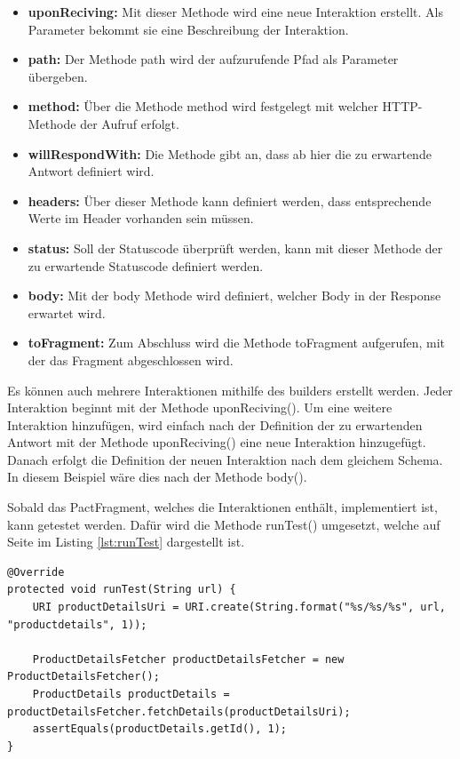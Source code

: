 \documentclass{llncs}
\begin{document}
\begin{itemize}
\item \textbf{uponReciving: } Mit dieser Methode wird eine neue Interaktion erstellt. Als Parameter bekommt sie eine Beschreibung der Interaktion.
\item \textbf{path: } Der Methode path wird der aufzurufende Pfad als Parameter übergeben.
\item \textbf{method: } Über die Methode method wird festgelegt mit welcher HTTP-Methode der Aufruf erfolgt.
\item \textbf{willRespondWith: } Die Methode gibt an, dass ab hier die zu erwartende Antwort definiert wird.
\item \textbf{headers: } Über dieser Methode kann definiert werden, dass entsprechende Werte im Header vorhanden sein müssen.
\item \textbf{status: } Soll der Statuscode überprüft werden, kann mit dieser Methode der zu erwartende Statuscode definiert werden.
\item \textbf{body: } Mit der body Methode wird definiert, welcher Body in der Response erwartet wird.
\item \textbf{toFragment: } Zum Abschluss wird die Methode toFragment aufgerufen, mit der das Fragment abgeschlossen wird.
\end{itemize}

Es können auch mehrere Interaktionen mithilfe des builders erstellt werden. Jeder Interaktion beginnt mit der Methode uponReciving(). Um eine weitere Interaktion hinzufügen, wird einfach nach der Definition der zu erwartenden Antwort mit der Methode uponReciving() eine neue Interaktion hinzugefügt. Danach erfolgt die Definition der neuen Interaktion nach dem gleichem Schema. In diesem Beispiel wäre dies nach der Methode body().

Sobald das PactFragment, welches die Interaktionen enthält, implementiert ist, kann getestet werden. Dafür wird die Methode runTest() umgesetzt, welche auf Seite \pageref{lst:runTest} im Listing \ref{lst:runTest} dargestellt ist.

\lstset{language = Java}
\begin{lstlisting}[caption=Implementierung runTest(),label=lst:runTest]
@Override
protected void runTest(String url) {
    URI productDetailsUri = URI.create(String.format("%s/%s/%s", url, "productdetails", 1));

    ProductDetailsFetcher productDetailsFetcher = new ProductDetailsFetcher();
    ProductDetails productDetails =  productDetailsFetcher.fetchDetails(productDetailsUri);
    assertEquals(productDetails.getId(), 1);
}
\end{lstlisting}
\end{document}
